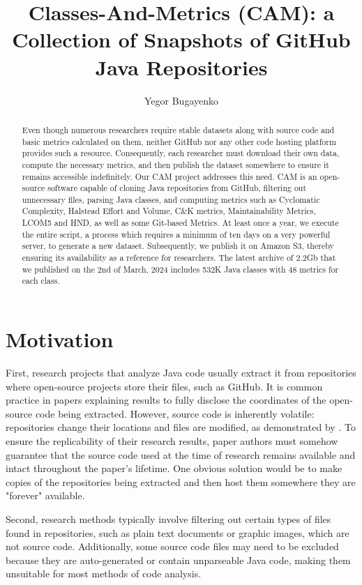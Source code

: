 \documentclass[11pt,sigplan,nonacm]{acmart}
\title{Classes-And-Metrics (CAM): a Collection of Snapshots of GitHub Java Repositories}
\author{Yegor Bugayenko}
\affiliation{\institution{Huawei, Russia, Moscow}\city{}\country{}}
\begin{document}
\begin{abstract}
Even though numerous researchers require stable datasets along with source code and basic metrics calculated on them, neither GitHub nor any other code hosting platform provides such a resource. Consequently, each researcher must download their own data, compute the necessary metrics, and then publish the dataset somewhere to ensure it remains accessible indefinitely. Our CAM project addresses this need. CAM is an open-source software capable of cloning Java repositories from GitHub, filtering out unnecessary files, parsing Java classes, and computing metrics such as Cyclomatic Complexity, Halstead Effort and Volume, C\&K metrics, Maintainability Metrics, LCOM5 and HND, as well as some Git-based Metrics. At least once a year, we execute the entire script, a process which requires a minimum of ten days on a very powerful server, to generate a new dataset. Subsequently, we publish it on Amazon S3, thereby ensuring its availability as a reference for researchers. The latest archive of 2.2Gb that we published on the 2nd of March, 2024 includes 532K Java classes with 48 metrics for each class.
\end{abstract}

\maketitle

\section{Motivation}

First, research projects that analyze Java code usually extract it from repositories where open-source projects store their files, such as GitHub. It is common practice in papers explaining results to fully disclose the coordinates of the open-source code being extracted. However, source code is inherently volatile: repositories change their locations and files are modified, as demonstrated by \citet{5463348}. To ensure the replicability of their research results, paper authors must somehow guarantee that the source code used at the time of research remains available and intact throughout the paper's lifetime. One obvious solution would be to make copies of the repositories being extracted and then host them somewhere they are "forever" available.

Second, research methods typically involve filtering out certain types of files found in repositories, such as plain text documents or graphic images, which are not source code. Additionally, some source code files may need to be excluded because they are auto-generated or contain unparseable Java code, making them unsuitable for most methods of code analysis.
\end{document}
